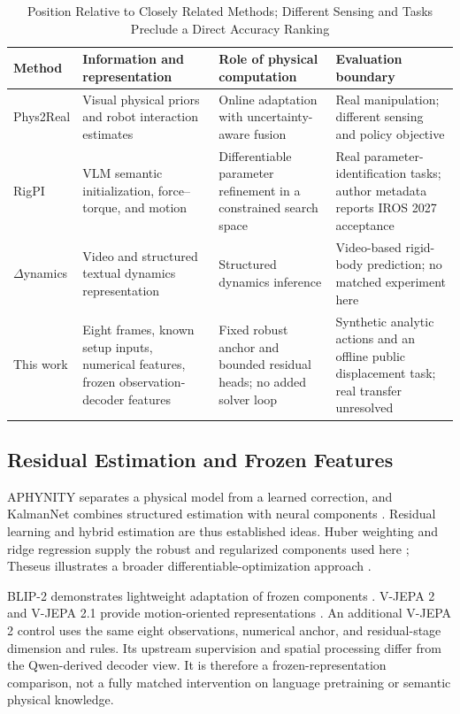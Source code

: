 \documentclass{ieeeaccess}
\begin{document}
\begin{table}[t]
\caption{Position Relative to Closely Related Methods; Different Sensing and Tasks Preclude a Direct Accuracy Ranking}
\label{tab:related}\centering\small
\begin{tabular}{p{}p{}p{}p{}}
\toprule Method & Information and representation & Role of physical computation & Evaluation boundary \\ \midrule
Phys2Real \cite{wang2026phys2real} & Visual physical priors and robot interaction estimates & Online adaptation with uncertainty-aware fusion & Real manipulation; different sensing and policy objective \\
RigPI \cite{he2026rigpi} & VLM semantic initialization, force--torque, and motion & Differentiable parameter refinement in a constrained search space & Real parameter-identification tasks; author metadata reports IROS 2027 acceptance \\
$\Delta$ynamics \cite{kao2026dynamics} & Video and structured textual dynamics representation & Structured dynamics inference & Video-based rigid-body prediction; no matched experiment here \\
This work & Eight frames, known setup inputs, numerical features, frozen observation-decoder features & Fixed robust anchor and bounded residual heads; no added solver loop & Synthetic analytic actions and an offline public displacement task; real transfer unresolved \\
\bottomrule\end{tabular}
\end{table}

\subsection{Residual Estimation and Frozen Features}
APHYNITY separates a physical model from a learned correction, and KalmanNet combines structured estimation with neural components \cite{yin2021aphynity,revach2022kalmannet}. Residual learning and hybrid estimation are thus established ideas. Huber weighting and ridge regression supply the robust and regularized components used here \cite{huber1964robust,hoerl1970ridge}; Theseus illustrates a broader differentiable-optimization approach \cite{pineda2022theseus}.

BLIP-2 demonstrates lightweight adaptation of frozen components \cite{li2023blip2}. V-JEPA 2 and V-JEPA 2.1 provide motion-oriented representations \cite{assran2025vjepa2,murlabadia2026vjepa21}. An additional V-JEPA 2 control uses the same eight observations, numerical anchor, and residual-stage dimension and rules. Its upstream supervision and spatial processing differ from the Qwen-derived decoder view. It is therefore a frozen-representation comparison, not a fully matched intervention on language pretraining or semantic physical knowledge.
\end{document}
